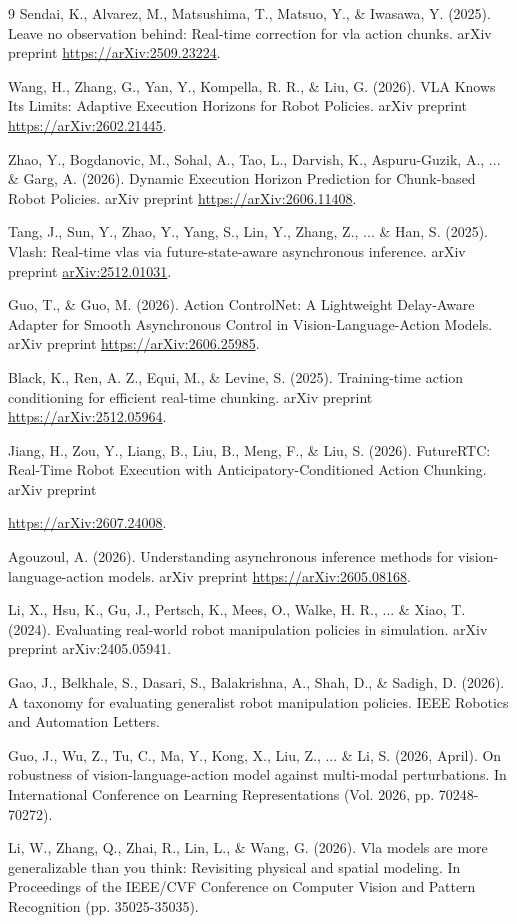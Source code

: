 \documentclass{article}
\begin{document}
{\begin{thebibliography}{9}
Sendai, K., Alvarez, M., Matsushima, T., Matsuo, Y., \& Iwasawa, Y. (2025). Leave no observation behind: Real-time correction for vla action chunks. arXiv preprint
\url{https://arXiv:2509.23224}.

Wang, H., Zhang, G., Yan, Y., Kompella, R. R., \& Liu, G. (2026). VLA Knows Its Limits: Adaptive Execution Horizons for Robot Policies. arXiv preprint
\url{https://arXiv:2602.21445}.

Zhao, Y., Bogdanovic, M., Sohal, A., Tao, L., Darvish, K., Aspuru-Guzik, A., ... \& Garg, A. (2026). Dynamic Execution Horizon Prediction for Chunk-based Robot Policies. arXiv preprint
\url{https://arXiv:2606.11408}.

Tang, J., Sun, Y., Zhao, Y., Yang, S., Lin, Y., Zhang, Z., ... \& Han, S. (2025). Vlash: Real-time vlas via future-state-aware asynchronous inference. arXiv preprint
\url{arXiv:2512.01031}.

Guo, T., \& Guo, M. (2026). Action ControlNet: A Lightweight Delay-Aware Adapter for Smooth Asynchronous Control in Vision-Language-Action Models. arXiv preprint
\url{https://arXiv:2606.25985}.

Black, K., Ren, A. Z., Equi, M., \& Levine, S. (2025). Training-time action conditioning for efficient real-time chunking. arXiv preprint \url{https://arXiv:2512.05964}.

Jiang, H., Zou, Y., Liang, B., Liu, B., Meng, F., \& Liu, S. (2026). FutureRTC: Real-Time Robot Execution with Anticipatory-Conditioned Action Chunking. arXiv preprint

\url{https://arXiv:2607.24008}.

Agouzoul, A. (2026). Understanding asynchronous inference methods for vision-language-action models. arXiv preprint
\url{https://arXiv:2605.08168}.

Li, X., Hsu, K., Gu, J., Pertsch, K., Mees, O., Walke, H. R., ... \& Xiao, T. (2024). Evaluating real-world robot manipulation policies in simulation. arXiv preprint arXiv:2405.05941.

Gao, J., Belkhale, S., Dasari, S., Balakrishna, A., Shah, D., \& Sadigh, D. (2026). A taxonomy for evaluating generalist robot manipulation policies. IEEE Robotics and Automation Letters.

Guo, J., Wu, Z., Tu, C., Ma, Y., Kong, X., Liu, Z., ... \& Li, S. (2026, April). On robustness of vision-language-action model against multi-modal perturbations. In International Conference on Learning Representations (Vol. 2026, pp. 70248-70272).

Li, W., Zhang, Q., Zhai, R., Lin, L., \& Wang, G. (2026). Vla models are more generalizable than you think: Revisiting physical and spatial modeling. In Proceedings of the IEEE/CVF Conference on Computer Vision and Pattern Recognition (pp. 35025-35035).

\end{thebibliography}
}
\end{document}

